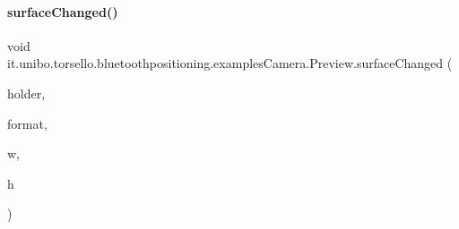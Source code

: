 \hypertarget{classit_1_1unibo_1_1torsello_1_1bluetoothpositioning_1_1examplesCamera_1_1Preview_a05b0be70607a79a5cc710bdb8f9710c8_a05b0be70607a79a5cc710bdb8f9710c8}{}\label{classit_1_1unibo_1_1torsello_1_1bluetoothpositioning_1_1examplesCamera_1_1Preview_a05b0be70607a79a5cc710bdb8f9710c8_a05b0be70607a79a5cc710bdb8f9710c8} 
\paragraph{\texorpdfstring{surface\+Changed()}{surfaceChanged()}}
{\footnotesize\ttfamily void it.\+unibo.\+torsello.\+bluetoothpositioning.\+examples\+Camera.\+Preview.\+surface\+Changed (\begin{DoxyParamCaption}\item[{Surface\+Holder}]{holder,  }\item[{int}]{format,  }\item[{int}]{w,  }\item[{int}]{h }\end{DoxyParamCaption})}


